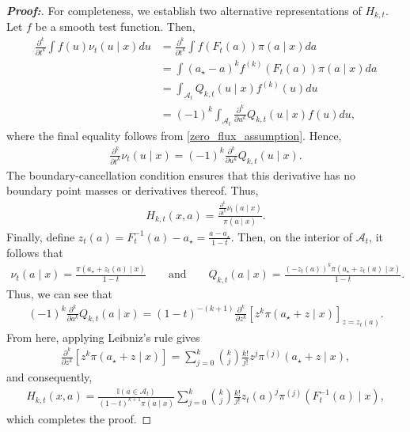 \documentclass[11pt,twoside]{article}
\theoremstyle{definition}
\theoremstyle{remark}
\begin{document}
\begin{proof}[\textbf{Proof:}]
For completeness, we establish two alternative representations of $H_{k,t}$. Let $f$ be a smooth test function. Then,
\begin{align*}
    \frac{\partial^k}{\partial t^k} \int f(u)\nu_t(u\mid x)du &= \frac{\partial^k}{\partial t^k} \int f(F_t(a))\pi(a\mid x)da \\
    &= \int (a_\star-a)^k f^{(k)}(F_t(a)) \pi(a\mid x)da \\
    &= \int_{\mathcal{A}_t}  Q_{k,t}(u\mid x)f^{(k)}(u)du \\
    &= (-1)^k \int_{\mathcal{A}_t} \frac{\partial^k}{\partial u^k} Q_{k,t}(u\mid x)f(u)du,
\end{align*}
where the final equality follows from \cref{zero_flux_assumption}. Hence, 
\begin{align*}
    \frac{\partial^k}{\partial t^k} \nu_t(u\mid x) = (-1)^k \frac{\partial^k}{\partial u^k} Q_{k,t}(u\mid x).
\end{align*}
The boundary-cancellation condition ensures that this derivative has
no boundary point masses or derivatives thereof. Thus,
\begin{align*}
    H_{k,t}(x,a) =  \frac{\frac{\partial^k}{\partial t^k} \nu_t(a\mid x)}{\pi(a\mid x)}.
\end{align*}
Finally, define $z_t(a) = F_t^{-1}(a)-a_\star = \frac{a-a_\star}{1-t}$. Then, on the interior of $\mathcal{A}_t$, it follows that
\begin{align*}
    \nu_t(a\mid x) = \frac{\pi(a_\star+z_t(a)\mid x)}{1-t} \qquad \text{and} \qquad  Q_{k,t}(a\mid x) = \frac{(-z_t(a))^k \pi(a_\star+z_t(a)\mid x)}{1-t}.
\end{align*}
Thus, we can see that 
\begin{align*}
    (-1)^k \frac{\partial^k}{\partial a^k} Q_{k,t}(a\mid x) = (1-t)^{-(k+1)} \frac{\partial^k}{\partial z^k} \left[z^k\pi(a_\star+z\mid x) \right]_{z=z_t(a)}.
\end{align*}
From here, applying Leibniz's rule gives
\begin{align*}
    \frac{\partial^k}{\partial z^k} \left[ z^k\pi(a_\star+z\mid x) \right] = \sum_{j=0}^{k} \binom{k}{j} \frac{k!}{j!} z^j \pi^{(j)}(a_\star+z\mid x),
\end{align*}
and consequently,
\begin{align*}
    H_{k,t}(x,a) = \frac{\mathbb{I}(a\in\mathcal{A}_t)}{(1-t)^{k+1}\pi(a\mid x) } \sum_{j=0}^{k} \binom{k}{j} \frac{k!}{j!} z_t(a)^j \pi^{(j)} (F_t^{-1}(a)\mid x),
\end{align*}
which completes the proof.
\end{proof}
\end{document}
